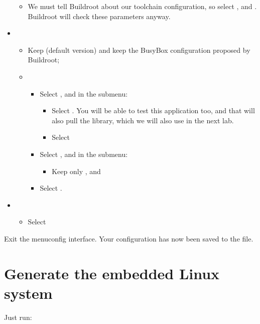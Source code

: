 \begin{itemize}
\begin{itemize}
  \item We must tell Buildroot about our toolchain configuration, so
    select ,
     and
    .
    Buildroot will check these parameters anyway.
  \end{itemize}
\item {}
  \begin{itemize}
  \item Keep  (default version) and keep the BusyBox
    configuration proposed by Buildroot;
  \item {}
    \begin{itemize}
    \item Select , and in the submenu:
    \begin{itemize}
         \item Select . You will be able to
	       test this application too, and that will also pull
	       the  library, which we will also use
	       in the next lab.
         \item Select 
    \end{itemize}
    \item Select , and in the submenu:
    \begin{itemize}
         \item Keep only ,  and 
    \end{itemize}
    \item Select .
    \end{itemize}
  \end{itemize}
\item {}
  \begin{itemize}
  \item Select 
  \end{itemize}
\end{itemize}

Exit the menuconfig interface. Your configuration has now been saved
to the  file.

\section{Generate the embedded Linux system}

Just run:

